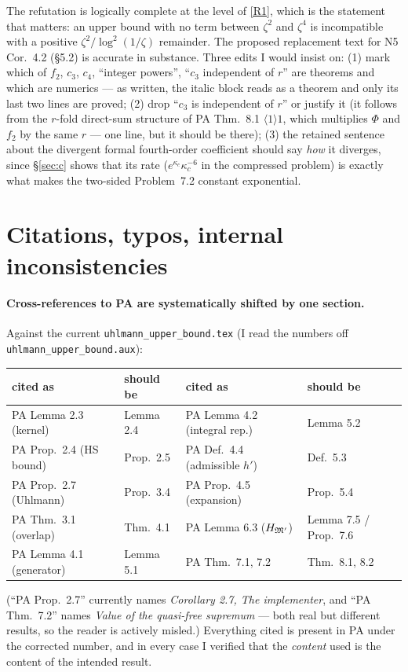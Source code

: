 \documentclass[11pt]{article}
\begin{document}
\begin{verdictok}
The refutation is logically complete at the level of \ref{R1}, which is the statement that matters:
an upper bound with no term between $\zeta^2$ and $\zeta^4$ is incompatible with a positive
$\zeta^2/\log^2(1/\zeta)$ remainder.  The proposed replacement text for N5 Cor.~4.2 (\S5.2) is
accurate in substance.  Three edits I would insist on: (1) mark which of $f_2$, $c_3$, $c_4$,
``integer powers'', ``$c_3$ independent of $r$'' are theorems and which are numerics --- as written,
the italic block reads as a theorem and only its last two lines are proved;
(2) drop ``$c_3$ is independent of $r$'' or justify it (it follows from the $r$-fold direct-sum
structure of PA Thm.~8.1 $\langle1\rangle1$, which multiplies $\Phi$ and $f_2$ by the same $r$ ---
one line, but it should be there); (3) the retained sentence about the divergent formal fourth-order
coefficient should say \emph{how} it diverges, since \S\ref{sec:c} shows that its rate
($e^{\kappa_c}\kappa_c^{-6}$ in the compressed problem) is exactly what makes the two-sided
Problem~7.2 constant exponential.
\end{verdictok}

\section{Citations, typos, internal inconsistencies}\label{sec:minor}

\paragraph{Cross-references to PA are systematically shifted by one section.}  Against the current
\texttt{uhlmann\_upper\_bound.tex} (I read the numbers off \texttt{uhlmann\_upper\_bound.aux}):
\begin{center}\small
\begin{tabular}{llll}\toprule
cited as & should be & cited as & should be\\\midrule
PA Lemma 2.3 (kernel) & Lemma 2.4 & PA Lemma 4.2 (integral rep.) & Lemma 5.2\\
PA Prop.\ 2.4 (HS bound) & Prop.\ 2.5 & PA Def.\ 4.4 (admissible $h'$) & Def.\ 5.3\\
PA Prop.\ 2.7 (Uhlmann) & Prop.\ 3.4 & PA Prop.\ 4.5 (expansion) & Prop.\ 5.4\\
PA Thm.\ 3.1 (overlap) & Thm.\ 4.1 & PA Lemma 6.3 ($H_{\mathfrak M'}$) & Lemma 7.5 / Prop.\ 7.6\\
PA Lemma 4.1 (generator) & Lemma 5.1 & PA Thm.\ 7.1, 7.2 & Thm.\ 8.1, 8.2\\
\bottomrule\end{tabular}\end{center}
(``PA Prop.\ 2.7'' currently names \emph{Corollary 2.7, The implementer}, and ``PA Thm.\ 7.2''
names \emph{Value of the quasi-free supremum} --- both real but different results, so the reader is
actively misled.)  Everything cited is present in PA under the corrected number, and in every case
I verified that the \emph{content} used is the content of the intended result.
\end{document}
